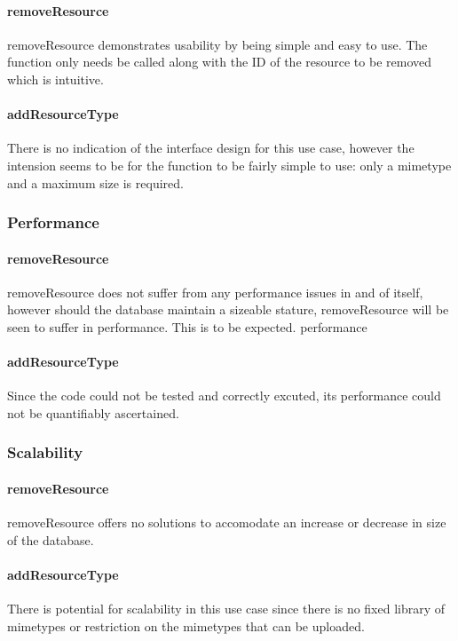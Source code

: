 \documentclass[a4paper]{article}
\begin{document}
\paragraph{removeResource}
removeResource demonstrates usability by being simple and easy to use. The function only needs be called along with the ID of the resource to be removed which is intuitive.

\paragraph{addResourceType}
There is no indication of the interface design for this use case, however the intension seems to be for the function to be fairly simple to use: only a mimetype and a maximum size is required.


\subsubsection {Performance}

\paragraph{removeResource}
removeResource does not suffer from any performance issues in and of itself, however should the database maintain a sizeable stature, removeResource will be seen to suffer in performance. This is to be expected.
performance

\paragraph{addResourceType}
Since the code could not be tested and correctly excuted, its performance could not be quantifiably ascertained.

\subsubsection {Scalability}

\paragraph{removeResource}
removeResource offers no solutions to accomodate an increase or decrease in size of the database.

\paragraph{addResourceType}
There is potential for scalability in this use case since there is no fixed library of mimetypes or restriction on the mimetypes that can be uploaded.
\end{document}
